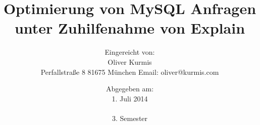 
\begin{titlepage}
\titlehead{\LARGE \textsc{FOM München\\\large Fachbereich Wirtschaftsinformatik}}
\subject{\vspace{1cm}Seminararbeit}
\title{Optimierung von MySQL Anfragen unter Zuhilfenahme von Explain}
\author{{\normalsize Eingereicht von:}\\Oliver Kurmis\\{\normalsize Perfallstraße 8 81675 München Email: oliver@kurmis.com}}
\date{{\normalsize Abgegeben am:}\\1. Juli 2014\\\\3. Semester}


\end{titlepage}

\maketitle 